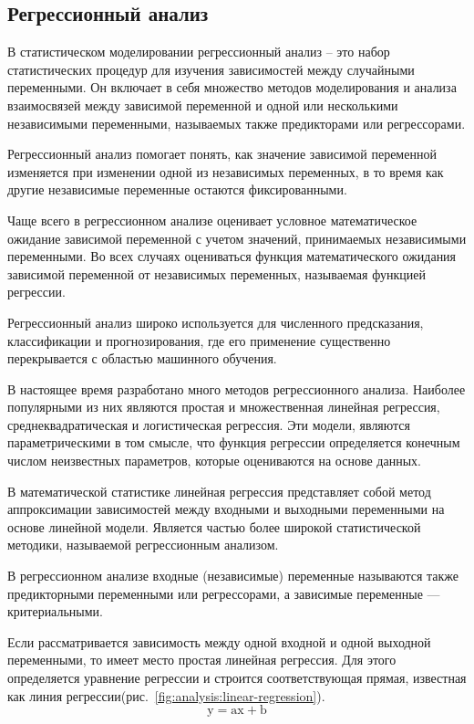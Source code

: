 \subsection{Регрессионный анализ}
\label{sec:analysis:regression}

В статистическом моделировании регрессионный анализ -- это набор статистических процедур для изучения зависимостей между
случайными переменными. Он включает в себя множество методов моделирования и анализа взаимосвязей между зависимой
переменной и одной или несколькими независимыми переменными, называемых также предикторами или регрессорами.

Регрессионный анализ помогает понять, как значение зависимой переменной изменяется при изменении одной из независимых
переменных, в то время как другие независимые переменные остаются фиксированными.

Чаще всего в регрессионном анализе оценивает условное математическое ожидание зависимой переменной с учетом значений,
принимаемых независимыми переменными. Во всех случаях оцениваться функция математического ожидания зависимой переменной
от независимых переменных, называемая функцией регрессии.

Регрессионный анализ широко используется для численного предсказания, классификации и прогнозирования, где его
применение существенно перекрывается с областью машинного обучения.

В настоящее время разработано много методов регрессионного анализа. Наиболее популярными из них являются простая и
множественная линейная регрессия, среднеквадратическая и логистическая регрессия. Эти модели, являются параметрическими
в том смысле, что функция регрессии определяется конечным числом неизвестных параметров, которые оцениваются на основе данных.

В математической статистике линейная регрессия представляет собой метод аппроксимации зависимостей между входными и
выходными переменными на основе линейной модели. Является частью более широкой статистической методики, называемой
регрессионным анализом.

В регрессионном анализе входные (независимые) переменные называются также предикторными переменными или регрессорами,
а зависимые переменные — критериальными.

Если рассматривается зависимость между одной входной и одной выходной переменными, то имеет место простая линейная
регрессия. Для этого определяется уравнение регрессии 
и строится соответствующая прямая, известная как линия регрессии(рис.~\ref{fig:analysis:linear-regression}).
\begin{equation}
	\text{y} = \text{ax} + \text{b}
\end{equation}

